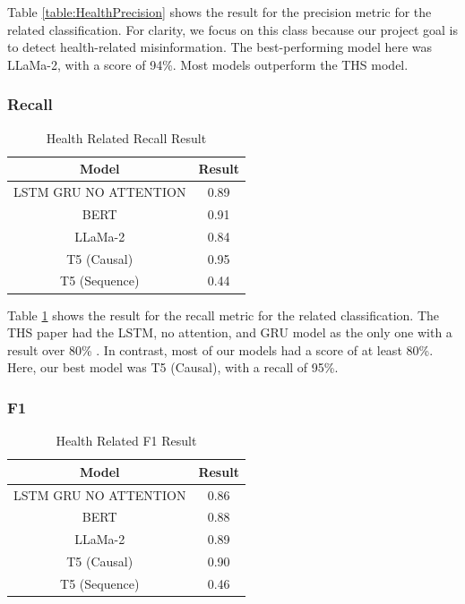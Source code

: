 Table \ref{table:HealthPrecision} shows the result for the precision metric for the related classification. For clarity, we focus on this class because our project
goal is to detect health-related misinformation. The best-performing model here was LLaMa-2, with a score of 94\%. Most models outperform the THS model.

\subsubsection{Recall}
\begin{table}[htbp]
	\centering
	\caption{Health Related Recall Result}
	{
	\begin{tabular}{||c | c||} 
		\hline
		\textbf{Model} & \textbf{Result} \\
		\hline
		LSTM GRU NO ATTENTION & 0.89  \\
		\hline
		BERT & 0.91  \\
		\hline
		LLaMa-2 & 0.84 \\ 
		\hline
		T5 (Causal) & 0.95 \\
		\hline
		T5 (Sequence) & 0.44 \\
		\hline
	\end{tabular}
	}
	\label{table:HealthRecall}
\end{table}

Table \ref{table:HealthRecall} shows the result for the recall metric for the related classification. The THS paper had  the LSTM, no attention, and
GRU model as the only one with a result over 80\% \cite{8622504}. In contrast, most of our models had a score of at least 80\%. Here, our best model was T5
(Causal), with a recall of 95\%.

\subsubsection{F1}
\begin{table}[htbp]
	\centering
	\caption{Health Related F1 Result}
	{
	\begin{tabular}{||c | c||} 
		\hline
		\textbf{Model} & \textbf{Result} \\
		\hline
		LSTM GRU NO ATTENTION & 0.86  \\
		\hline
		BERT & 0.88  \\
		\hline
		LLaMa-2 & 0.89 \\ 
		\hline
		T5 (Causal) & 0.90 \\
		\hline
		T5 (Sequence) & 0.46 \\
		\hline
	\end{tabular}
	}
	\label{table:HealthF1}
\end{table}

